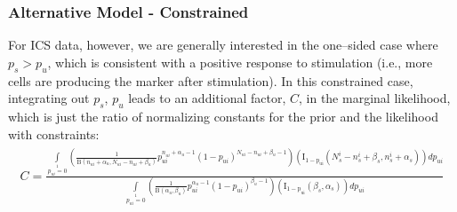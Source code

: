 \documentclass[11pt]{article}
\begin{document}
\subsubsection{Alternative Model - Constrained}
For ICS data, however, we are generally interested in the one--sided case where $p_s>p_u$, which is consistent with a positive response to stimulation (i.e., more cells are producing the marker after stimulation). In this constrained case, integrating out $p_s$, $p_u$ leads to an additional factor, $C$, in the marginal likelihood, which is just the ratio of normalizing constants for the prior and the likelihood with constraints:
\begin{align}
\begin{split}
	 C=\frac{\int\limits_{p_{ui}=0}\limits^{1}\left(\frac{1}{\mathrm{B}(n_{ui}+\alpha_u,N_{ui}-n_{ui}+\beta_u)}p_{ui}^{n_{ui}+\alpha_u-1}(1-p_{ui})^{N_{ui}-n_{ui}+\beta_u-1} \right)\left(\mathrm{I_{1-p_{ui}}}(N^i_s-n^i_s+\beta_s,n^i_s+\alpha_s)\right)d p_{ui}}{   \int\limits_{p_{ui}=0}\limits^{1}\left(\frac{1}{\mathrm{B}(\alpha_u,\beta_u)}p_{ui}^{\alpha_u-1}(1-p_{ui})^{\beta_u-1} \right)\left(\mathrm{I_{1-p_{ui}}}(\beta_s,\alpha_s)\right)d p_{ui}}
\label{eq:model2post}
\end{split}
\end{align}
\end{document}
